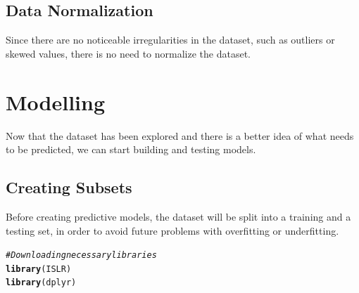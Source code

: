 \documentclass[a4paper,12pt]{article}\usepackage[]{graphicx}\usepackage[]{color}
\makeatletter
\newcommand{\hlcom}[1]{\textcolor[rgb]{0.678,0.584,0.686}{\textit{#1}}}%
\newcommand{\hlstd}[1]{\textcolor[rgb]{0.345,0.345,0.345}{#1}}%
\newcommand{\hlkwd}[1]{\textcolor[rgb]{0.737,0.353,0.396}{\textbf{#1}}}%
\newenvironment{kframe}{%
 \def\at@end@of@kframe{}%
 \ifinner\ifhmode%
  \def\at@end@of@kframe{\end{minipage}}%
  \begin{minipage}{\columnwidth}%
 \fi\fi%
 \def\FrameCommand##1{\hskip\@totalleftmargin \hskip-\fboxsep
 \colorbox{shadecolor}{##1}\hskip-\fboxsep
     \hskip-\linewidth \hskip-\@totalleftmargin \hskip\columnwidth}%
 \MakeFramed {\advance\hsize-\width
   \@totalleftmargin\z@ \linewidth\hsize
   \@setminipage}}%
 {\par\unskip\endMakeFramed%
 \at@end@of@kframe}
\newenvironment{knitrout}{}{} %
\makeatother
\begin{document}
\subsection{Data Normalization}\label{data_normalization}
Since there are no noticeable irregularities in the dataset, such as outliers or skewed values, there is no need to normalize the dataset.

\clearpage


\section{Modelling}\label{modelling}
Now that the dataset has been explored and there is a better idea of what needs to be predicted, we can start building and testing models.

\subsection{Creating Subsets}\label{subsets}
Before creating predictive models, the dataset will be split into a training and a testing set, in order to avoid future problems with overfitting or underfitting.

\begin{knitrout}
\color{fgcolor}\begin{kframe}
\begin{alltt}
\hlcom{# Downloading necessary libraries}
\hlkwd{library}\hlstd{(ISLR)}
\hlkwd{library}\hlstd{(dplyr)}
\end{alltt}
\end{kframe}
\end{knitrout}
\end{document}

